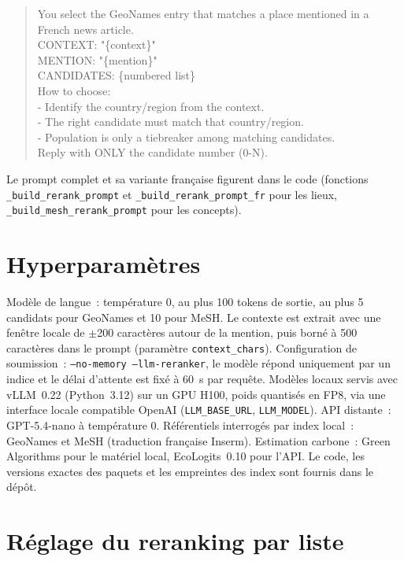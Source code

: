 \documentclass[10pt,twoside]{article}
\begin{document}
\begin{quote}\small\ttfamily\raggedright
You select the GeoNames entry that matches a place mentioned in a French news article.\\[3pt]
CONTEXT: "\{context\}"\\
MENTION: "\{mention\}"\\
CANDIDATES: \{numbered list\}\\[3pt]
How to choose:\\
- Identify the country/region from the context.\\
- The right candidate must match that country/region.\\
- Population is only a tiebreaker among matching candidates.\\[3pt]
Reply with ONLY the candidate number (0-N).
\end{quote}

\noindent Le prompt complet et sa variante française figurent dans le code (fonctions
\texttt{\_build\_rerank\_prompt} et \texttt{\_build\_rerank\_prompt\_fr} pour les lieux,
\texttt{\_build\_mesh\_rerank\_prompt} pour les concepts).

\section{Hyperparamètres}
\label{ann:hyper}

Modèle de langue~: température 0, au plus 100 tokens de sortie, au plus 5 candidats pour
GeoNames et 10 pour MeSH. Le contexte est extrait avec une fenêtre locale de $\pm$200 caractères
autour de la mention, puis borné à 500 caractères dans le prompt (paramètre
\texttt{context\_chars}). Configuration de soumission~: \texttt{--no-memory --llm-reranker}, le
modèle répond uniquement par un indice et le délai d'attente est fixé à 60~s par requête. Modèles locaux
servis avec vLLM~0.22 (Python~3.12) sur un GPU H100, poids quantisés en FP8, via une interface
locale compatible OpenAI (\texttt{LLM\_BASE\_URL}, \texttt{LLM\_MODEL}). API distante~:
GPT-5.4-nano à température 0. Référentiels interrogés par index local~: GeoNames et MeSH
(traduction française Inserm). Estimation carbone~: Green Algorithms pour le matériel local,
EcoLogits~0.10 pour l'API. Le code, les versions exactes des paquets et les empreintes des index
sont fournis dans le dépôt.

\section{Réglage du reranking par liste}
\label{ann:listwise}
\end{document}
